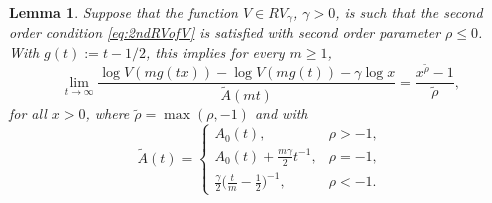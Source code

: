 \documentclass[10pt,a4paper]{amsart}
\newtheorem{lem}{Lemma}
\newcommand{\limit}[1]{\ensuremath{\displaystyle {\lim_{#1 \rightarrow{\infty}}}}}
\begin{document}
\begin{lem}\label{Lem:2ndOrdLogShift}
Suppose that the function $V\in RV_{\gamma}$, $\gamma>0$, is such that the second order condition \eqref{eq:2ndRVofV} is satisfied with second order parameter $\rho \leq 0$. With $g(t):=t-1/2$, this implies for every $m\geq 1$,
\begin{equation*}
 \limit{t} \frac{\log V(mg(tx))-\log V(mg(t))-\gamma\log x}{\tilde{A}(mt)}= 
 \frac{x^{\tilde{\rho}}-1}{\tilde{\rho}},
\end{equation*}
for all $x>0$, where $\tilde{\rho} = \max(\rho, -1)$ and with
\begin{equation*}
 \tilde{A}(t)=\begin{cases}
A_{0}(t), & \rho > -1, \\
A_{0}(t) +\frac{m\gamma}{2}{t}^{-1}, &\rho=-1,\\
\frac{\gamma}{2} \bigl(\frac{t}{m}-\frac{1}{2} \bigr)^{-1}, & \rho < -1.
\end{cases} 
\end{equation*}
\end{lem}
\end{document}
